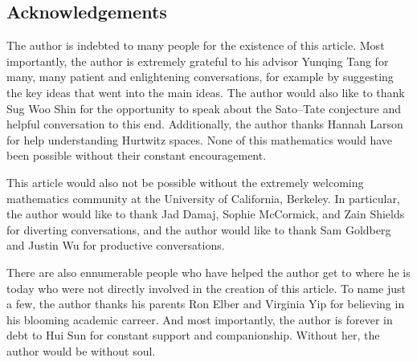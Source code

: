 \documentclass[openany]{book}
\begin{document}
\subsection{Acknowledgements}
The author is indebted to many people for the existence of this article. Most importantly, the author is extremely grateful to his advisor Yunqing Tang for many, many patient and enlightening conversations, for example by suggesting the key ideas that went into the main ideas. The author would also like to thank Sug Woo Shin for the opportunity to speak about the Sato--Tate conjecture and helpful conversation to this end. Additionally, the author thanks Hannah Larson for help understanding Hurtwitz spaces. None of this mathematics would have been possible without their constant encouragement.

This article would also not be possible without the extremely welcoming mathematics community at the University of California, Berkeley. In particular, the author would like to thank Jad Damaj, Sophie McCormick, and Zain Shields for diverting conversations, and the author would like to thank Sam Goldberg and Justin Wu for productive conversations.

There are also ennumerable people who have helped the author get to where he is today who were not directly involved in the creation of this article. To name just a few, the author thanks his parents Ron Elber and Virginia Yip for believing in his blooming academic carreer. And most importantly, the author is forever in debt to Hui Sun for constant support and companionship. Without her, the author would be without soul.



% 



% 




\nirprintbib
\nirprintindex
\end{document}
